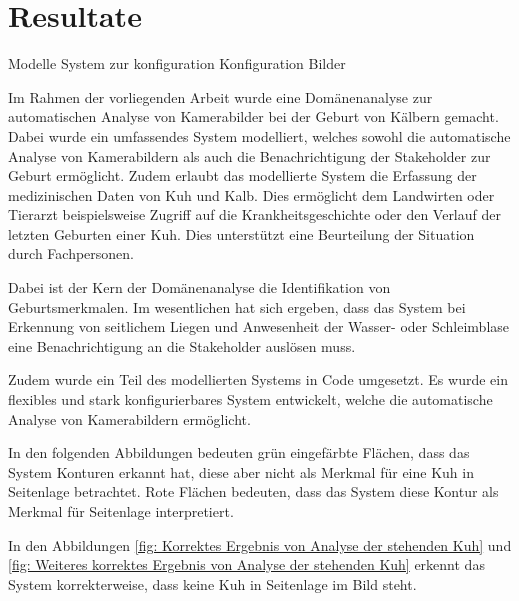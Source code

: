 

\chapter{Resultate}



 

Modelle
System zur konfiguration
Konfiguration 
Bilder

Im Rahmen der vorliegenden Arbeit wurde eine Domänenanalyse zur automatischen Analyse von Kamerabilder bei der Geburt von Kälbern gemacht. Dabei wurde ein umfassendes System modelliert, welches sowohl die automatische Analyse von Kamerabildern als auch die Benachrichtigung der Stakeholder zur Geburt ermöglicht. Zudem erlaubt das modellierte System die Erfassung der medizinischen Daten von Kuh und Kalb. Dies ermöglicht dem Landwirten oder Tierarzt beispielsweise Zugriff auf die Krankheitsgeschichte oder den Verlauf der letzten Geburten einer Kuh. Dies unterstützt eine Beurteilung der Situation durch Fachpersonen. 

Dabei ist der Kern der Domänenanalyse die Identifikation von Geburtsmerkmalen. Im wesentlichen hat sich ergeben, dass das System bei Erkennung von seitlichem Liegen und Anwesenheit der Wasser- oder Schleimblase eine Benachrichtigung an die Stakeholder auslösen muss. 

Zudem wurde ein Teil des modellierten Systems in Code umgesetzt. Es wurde ein flexibles und stark konfigurierbares System entwickelt, welche die automatische Analyse von Kamerabildern ermöglicht.

In den folgenden Abbildungen bedeuten grün eingefärbte Flächen, dass das System Konturen erkannt hat, diese aber nicht als Merkmal für eine Kuh in Seitenlage betrachtet. Rote Flächen bedeuten, dass das System diese Kontur als Merkmal für Seitenlage interpretiert.

In den Abbildungen \ref{fig: Korrektes Ergebnis von Analyse der stehenden Kuh} und \ref{fig: Weiteres korrektes Ergebnis von Analyse der stehenden Kuh} erkennt das System korrekterweise, dass keine Kuh in Seitenlage im Bild steht.

